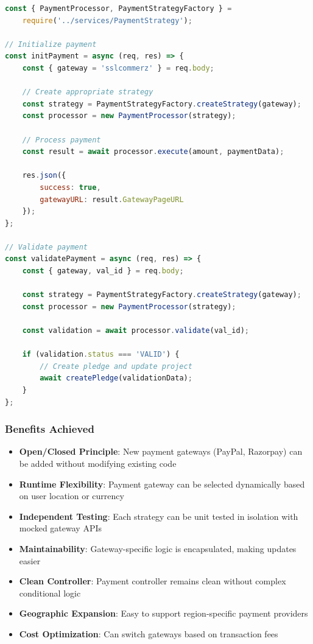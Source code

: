 \documentclass[a4paper,12pt]{report}
\begin{document}
\begin{lstlisting}[language=JavaScript, caption=Strategy Pattern Usage]
const { PaymentProcessor, PaymentStrategyFactory } = 
    require('../services/PaymentStrategy');

// Initialize payment
const initPayment = async (req, res) => {
    const { gateway = 'sslcommerz' } = req.body;
    
    // Create appropriate strategy
    const strategy = PaymentStrategyFactory.createStrategy(gateway);
    const processor = new PaymentProcessor(strategy);
    
    // Process payment
    const result = await processor.execute(amount, paymentData);
    
    res.json({ 
        success: true, 
        gatewayURL: result.GatewayPageURL 
    });
};

// Validate payment
const validatePayment = async (req, res) => {
    const { gateway, val_id } = req.body;
    
    const strategy = PaymentStrategyFactory.createStrategy(gateway);
    const processor = new PaymentProcessor(strategy);
    
    const validation = await processor.validate(val_id);
    
    if (validation.status === 'VALID') {
        // Create pledge and update project
        await createPledge(validationData);
    }
};
\end{lstlisting}

\subsubsection{Benefits Achieved}

\begin{itemize}
    \item \textbf{Open/Closed Principle}: New payment gateways (PayPal, Razorpay) can be added without modifying existing code
    \item \textbf{Runtime Flexibility}: Payment gateway can be selected dynamically based on user location or currency
    \item \textbf{Independent Testing}: Each strategy can be unit tested in isolation with mocked gateway APIs
    \item \textbf{Maintainability}: Gateway-specific logic is encapsulated, making updates easier
    \item \textbf{Clean Controller}: Payment controller remains clean without complex conditional logic
    \item \textbf{Geographic Expansion}: Easy to support region-specific payment providers
    \item \textbf{Cost Optimization}: Can switch gateways based on transaction fees
\end{itemize}
\end{document}
